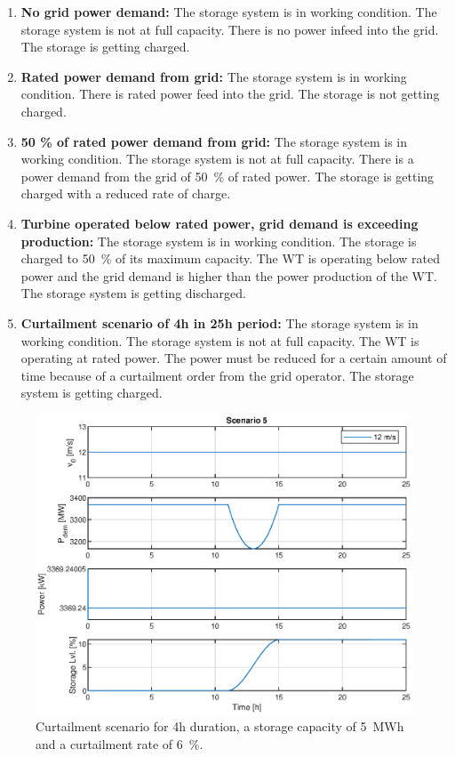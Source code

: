 \begin{enumerate}
	\item \textbf{No grid power demand:}
	The storage system is in working condition.
	The storage system is not at full capacity.
	There is no power infeed into the grid.
	The storage is getting charged.
	
	\item \textbf{Rated power demand from grid:}
	The storage system is in working condition.
	There is rated power feed into the grid.
	The storage is not getting charged.
	
	\item \textbf{50 \% of rated power demand from grid:}
	The storage system is in working condition.
	The storage system is not at full capacity.
	There is a power demand from the grid of \SI{50}{\%} of rated power.
	The storage is getting charged with a reduced rate of charge.
	
	\item \textbf{Turbine operated below rated power, grid demand is exceeding production:}
	The storage system is in working condition.
	The storage is charged to \SI{50}{\%} of its maximum capacity.
	The \gls{WT} is operating below rated power and the grid demand is higher than the power production of the \gls{WT}.
	The storage system is getting discharged.
	
	\item \textbf{Curtailment scenario of 4h in 25h period:}
	The storage system is in working condition.
	The storage system is not at full capacity.
	The WT is operating at rated power.
	The power must be reduced for a certain amount of time because of a curtailment order from the grid operator.
	The storage system is getting charged.
\end{enumerate}

\begin{figure}[h]
	\centering	
	\includegraphics[width=12cm]{Figures/StorageDummyCurtailmentScenario.eps}
	\caption{Curtailment scenario for 4h duration, a storage capacity of \SI{5}{MWh} and a curtailment rate of \SI{6}{\%}.}
	\label{fig:curtailment scenario}
\end{figure} 
\newpage